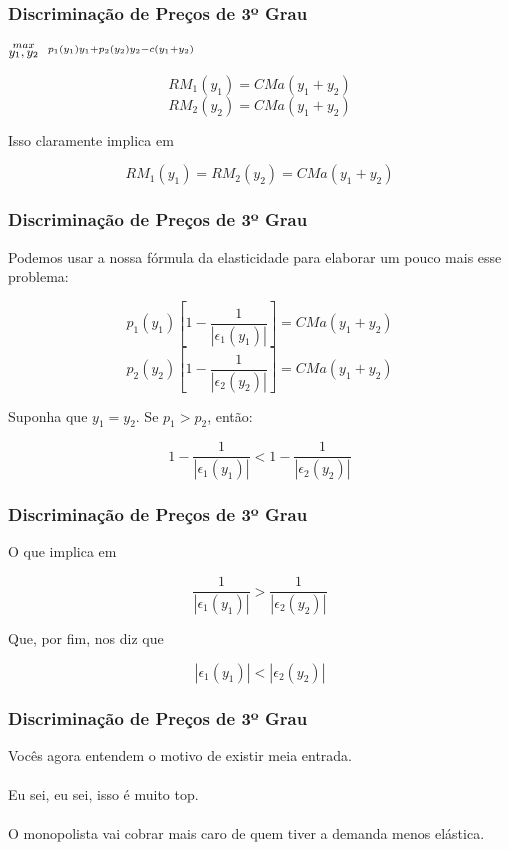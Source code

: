 \documentclass{beamer}[10]
\begin{document}
\begin{frame}
	\frametitle{Discriminação de Preços de 3º Grau}

	\begin{center}
		\LARGE $\stackrel{max}{\text{\small $y_1,y_2$}} \ \  \stackrel{p_1(y_1)y_1 + p_2(y_2)y_2 - c(y_1 + y_2)}{\ }$ \\
	\end{center}

	$$ RM_1(y_1) = CMa(y_1+y_2) $$
	$$ RM_2(y_2) = CMa(y_1+y_2) $$

	\begin{center}
		Isso claramente implica em
	\end{center}

	$$ RM_1(y_1) = RM_2(y_2) = CMa(y_1+y_2) $$

\end{frame}

\begin{frame}
	\frametitle{Discriminação de Preços de 3º Grau}

	Podemos usar a nossa fórmula da elasticidade para elaborar um pouco mais esse problema:

	$$ p_1(y_1) \left[1 - \frac{1}{|\epsilon_1(y_1)|} \right] = CMa(y_1 + y_2) $$
	$$ p_2(y_2) \left[1 - \frac{1}{|\epsilon_2(y_2)|} \right] = CMa(y_1 + y_2) $$

	Suponha que $y_1 = y_2$. Se $p_1 > p_2$, então:

	$$ 1 - \frac{1}{|\epsilon_1(y_1)|} < 1 - \frac{1}{|\epsilon_2(y_2)|} $$

\end{frame}

\begin{frame}
	\frametitle{Discriminação de Preços de 3º Grau}

	O que implica em

	$$ \frac{1}{|\epsilon_1(y_1)|} > \frac{1}{|\epsilon_2(y_2)|} $$

	Que, por fim, nos diz que

	$$ |\epsilon_1(y_1)| < |\epsilon_2(y_2)| $$

\end{frame}

\begin{frame}
	\frametitle{Discriminação de Preços de 3º Grau}

	Vocês agora entendem o motivo de existir meia entrada.
	\\~\\
	Eu sei, eu sei, isso é muito top.
	\\~\\
	O monopolista vai cobrar mais caro de quem tiver a demanda menos elástica.

\end{frame}
\end{document}
